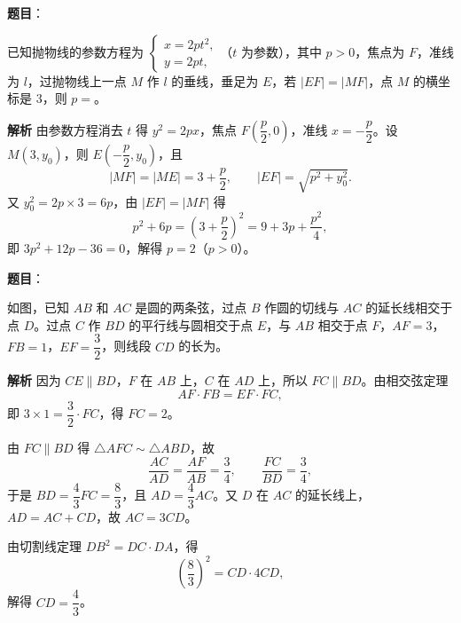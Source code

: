\begin{answer}

\textbf{题目}：

已知抛物线的参数方程为 $\begin{cases}x=2pt^2,\\y=2pt,\end{cases}$（$t$ 为参数），其中 $p>0$，焦点为 $F$，准线为 $l$，过抛物线上一点 $M$ 作 $l$ 的垂线，垂足为 $E$，若 $|EF|=|MF|$，点 $M$ 的横坐标是 $3$，则 $p=$\gkblank{}。

\textbf{解析}
由参数方程消去 $t$ 得 $y^2=2px$，焦点 $F\left(\dfrac p2,0\right)$，准线 $x=-\dfrac p2$。设 $M(3,y_0)$，则 $E\left(-\dfrac p2,y_0\right)$，且
\nopagebreak[4]
\[|MF|=|ME|=3+\frac p2,\qquad |EF|=\sqrt{p^2+y_0^2}.\]
又 $y_0^2=2p\times3=6p$，由 $|EF|=|MF|$ 得
\nopagebreak[4]
\[p^2+6p=\left(3+\frac p2\right)^2=9+3p+\frac{p^2}4,\]
即 $3p^2+12p-36=0$，解得 $p=2$（$p>0$）。


\end{answer}
\begin{answer}

\textbf{题目}：

如图，已知 $AB$ 和 $AC$ 是圆的两条弦，过点 $B$ 作圆的切线与 $AC$ 的延长线相交于点 $D$。过点 $C$ 作 $BD$ 的平行线与圆相交于点 $E$，与 $AB$ 相交于点 $F$，$AF=3$，$FB=1$，$EF=\dfrac32$，则线段 $CD$ 的长为\gkblank{}。
\nopagebreak[4]
\begin{center}\end{center}
\nopagebreak[4]
\textbf{解析}
因为 $CE\parallel BD$，$F$ 在 $AB$ 上，$C$ 在 $AD$ 上，所以 $FC\parallel BD$。由相交弦定理
\nopagebreak[4]
\[AF\cdot FB=EF\cdot FC,\]
即 $3\times1=\dfrac32\cdot FC$，得 $FC=2$。

由 $FC\parallel BD$ 得 $\triangle AFC\sim\triangle ABD$，故
\nopagebreak[4]
\[\frac{AC}{AD}=\frac{AF}{AB}=\frac34,\qquad \frac{FC}{BD}=\frac34,\]
于是 $BD=\dfrac43FC=\dfrac83$，且 $AD=\dfrac43AC$。又 $D$ 在 $AC$ 的延长线上，$AD=AC+CD$，故 $AC=3CD$。

由切割线定理 $DB^2=DC\cdot DA$，得
\nopagebreak[4]
\[\left(\frac83\right)^2=CD\cdot4CD,\]
解得 $CD=\dfrac43$。


\end{answer}
